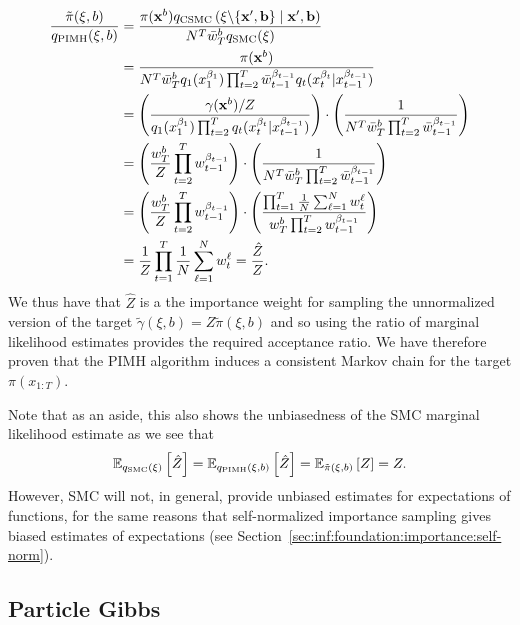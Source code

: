 \begin{align}
\frac{\tilde{\pi}(\xi,b)}{q_{\text{PIMH}}(\mathbf{\xi},b)} &= \frac{\pi(\mathbf{x}^{b}) q_{\text{CSMC}}\left(\mathbf{\xi} \backslash \{\mathbf{x}', \mathbf{b}\} \mid \mathbf{x}', \mathbf{b} \right)}
{N^T \bar{w}_T^b q_{\text{SMC}}(\mathbf{\xi})} \\
&= \frac{\pi(\mathbf{x}^{b})}{N^T \bar{w}_T^b q_1(x_1^{\beta_1}) \prod_{t=2}^{T} \bar{w}_{t-1}^{\beta_{t-1}} q_t(x_t^{\beta_t} | x_{t-1}^{\beta_{t-1}})} \nonumber \\
&= \left(\frac{\gamma(\mathbf{x}^{b})/Z}{
	q_1(x_1^{\beta_1}) \prod_{t=2}^{T} q_t(x_t^{\beta_t} | x_{t-1}^{\beta_{t-1}})}\right) \cdot
	\left( \frac{1}{N^T \bar{w}_T^b\prod_{t=2}^{T} \bar{w}_{t-1}^{\beta_{t-1}}} \right) \nonumber \\
&= \left(\frac{w_T^b}{Z}
	 \prod_{t=2}^{T} w_{t-1}^{\beta_{t-1}}\right)\cdot\left(
	\frac{1}{N^T \bar{w}_T^b \prod_{t=2}^{T} \bar{w}_{t-1}^{\beta_{t-1}}}\right) \nonumber \\
&= \left(\frac{w_T^b}{Z}
	\prod_{t=2}^{T} w_{t-1}^{\beta_{t-1}}\right)\cdot\left(
	\frac{\prod_{t=1}^T \frac{1}{N} \sum_{\ell=1}^N w_{t}^{\ell}}{w_T^b \prod_{t=2}^{T} w_{t-1}^{\beta_{t-1}}}\right) \nonumber \\
&= \frac{1}{Z} \prod_{t=1}^T \frac{1}{N} \sum_{\ell=1}^N w_{t}^{\ell}
= \frac{\hat{Z}}{Z}.
\end{align}
We thus have that $\hat{Z}$ is a the importance weight for sampling the unnormalized
version of the target $\tilde{\gamma}(\xi,b) = Z \tilde{\pi}(\xi,b)$ and so using the
ratio of marginal likelihood estimates provides the required acceptance ratio.  We
have therefore proven that the PIMH algorithm induces a consistent Markov chain for
the target $\pi(x_{1:T})$.

Note that as an aside, this also shows the unbiasedness of the SMC marginal likelihood estimate
as we see that
\begin{align}
\mathbb{E}_{q_{\text{SMC}}(\mathbf{\xi})} \left[\hat{Z}\right] = \mathbb{E}_{q_{\text{PIMH}}(\mathbf{\xi},b)} 
\left[\hat{Z}\right]=\mathbb{E}_{\tilde{\pi}(\xi,b)} \left[Z\right]=Z.
\end{align}
However, SMC will not, in general, provide unbiased estimates for expectations of
functions, for the same reasons that self-normalized importance sampling gives biased
estimates of expectations (see Section~\ref{sec:inf:foundation:importance:self-norm}).

\subsection{Particle Gibbs}
\label{sec:part:pmcmc:pgibbs}


